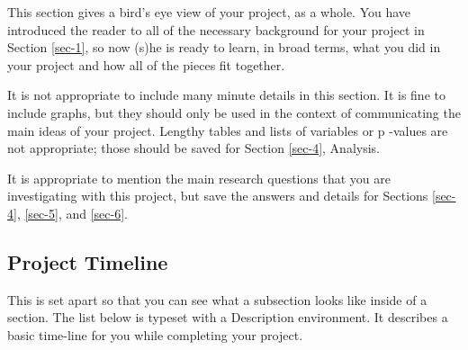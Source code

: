 \documentclass[11pt]{article}
\begin{document}
This section gives a bird's eye view of your project, as a whole.  You
have introduced the reader to all of the necessary background for your
project in Section \ref{sec-1}, so now (s)he is ready to learn,
in broad terms, what you did in your project and how all of the pieces
fit together.

It is not appropriate to include many minute details in this
section. It is fine to include graphs, but they should only be used in
the context of communicating the main ideas of your project. Lengthy
tables and lists of variables or p -values are not appropriate; those
should be saved for Section \ref{sec-4}, Analysis.

It is appropriate to mention the main research questions that you are
investigating with this project, but save the answers and details for
Sections \ref{sec-4}, \ref{sec-5}, and \ref{sec-6}.

\subsection[Project Timeline]{Project Timeline}
\label{sec-2-1}

This is set apart so that you can see what a subsection looks like
inside of a section. The list below is typeset with a Description
environment. It describes a basic time-line for you while completing
your project.
\end{document}
